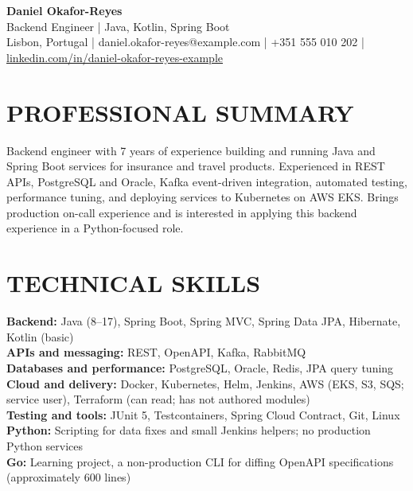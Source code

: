 \documentclass[11pt,a4paper]{article}
\begin{document}
\begin{center}
{\LARGE\bfseries Daniel Okafor-Reyes}\\
Backend Engineer | Java, Kotlin, Spring Boot\\
Lisbon, Portugal | daniel.okafor-reyes@example.com | +351 555 010 202 | \href{https://linkedin.com/in/daniel-okafor-reyes-example}{linkedin.com/in/daniel-okafor-reyes-example}
\end{center}

\section*{PROFESSIONAL SUMMARY}
Backend engineer with 7 years of experience building and running Java and Spring Boot services for insurance and travel products. Experienced in REST APIs, PostgreSQL and Oracle, Kafka event-driven integration, automated testing, performance tuning, and deploying services to Kubernetes on AWS EKS. Brings production on-call experience and is interested in applying this backend experience in a Python-focused role.

\section*{TECHNICAL SKILLS}
\textbf{Backend:} Java (8--17), Spring Boot, Spring MVC, Spring Data JPA, Hibernate, Kotlin (basic)\\
\textbf{APIs and messaging:} REST, OpenAPI, Kafka, RabbitMQ\\
\textbf{Databases and performance:} PostgreSQL, Oracle, Redis, JPA query tuning\\
\textbf{Cloud and delivery:} Docker, Kubernetes, Helm, Jenkins, AWS (EKS, S3, SQS; service user), Terraform (can read; has not authored modules)\\
\textbf{Testing and tools:} JUnit 5, Testcontainers, Spring Cloud Contract, Git, Linux\\
\textbf{Python:} Scripting for data fixes and small Jenkins helpers; no production Python services\\
\textbf{Go:} Learning project, a non-production CLI for diffing OpenAPI specifications (approximately 600 lines)
\end{document}
